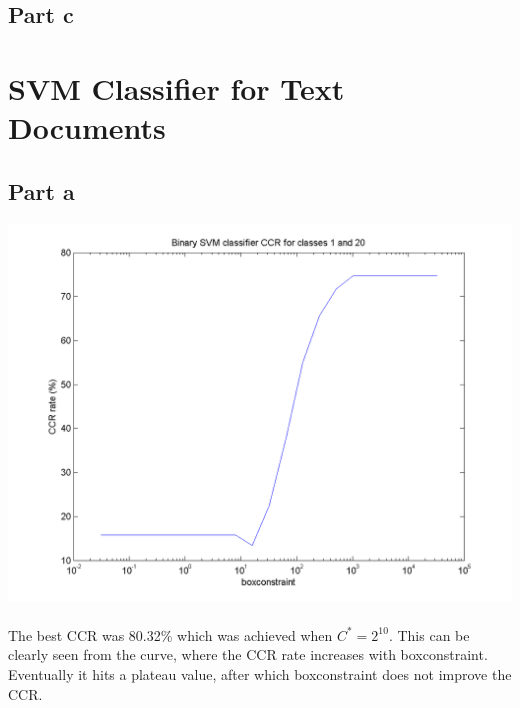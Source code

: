 \documentclass[paper=a4, fontsize=11pt]{scrartcl} %
\numberwithin{equation}{section} %
\numberwithin{figure}{section} %
\numberwithin{table}{section} %
\begin{document}
	\newpage
	\subsection{Part c}

	\newpage
	
	\section{SVM Classifier for Text Documents}
	
	\subsection{Part a}
	\includegraphics[scale=.8]{part_a_CV_CCR}
	\\\\
	The best CCR was 80.32\% which was achieved when $C^*=2^{10}$. This can be clearly seen from the curve, where the CCR rate increases with boxconstraint. Eventually it hits a plateau value, after which boxconstraint does not improve the CCR.
	\newpage
\end{document}
